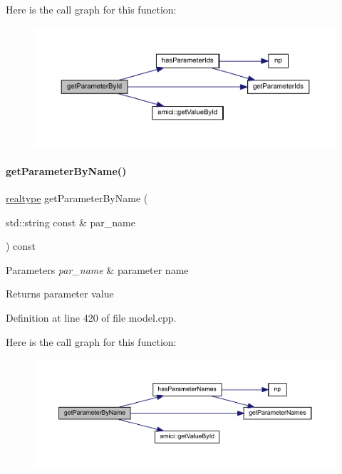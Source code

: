 Here is the call graph for this function\+:
\nopagebreak
\begin{figure}[H]
\begin{center}
\leavevmode
\includegraphics[width=350pt]{classamici_1_1_model_a4436bd89ae2cb032cbf13db478d99e15_cgraph}
\end{center}
\end{figure}
\mbox{\label{classamici_1_1_model_a19b349ca9793d45fda7ef8ea7422747a}} 
\paragraph{\texorpdfstring{getParameterByName()}{getParameterByName()}}
{\footnotesize\ttfamily \mbox{\hyperlink{namespaceamici_a1bdce28051d6a53868f7ccbf5f2c14a3}{realtype}} get\+Parameter\+By\+Name (\begin{DoxyParamCaption}\item[{std\+::string const \&}]{par\+\_\+name }\end{DoxyParamCaption}) const}


\begin{DoxyParams}{Parameters}
{\em par\+\_\+name} & parameter name \\
\hline
\end{DoxyParams}
\begin{DoxyReturn}{Returns}
parameter value 
\end{DoxyReturn}


Definition at line 420 of file model.\+cpp.

Here is the call graph for this function\+:
\nopagebreak
\begin{figure}[H]
\begin{center}
\leavevmode
\includegraphics[width=350pt]{classamici_1_1_model_a19b349ca9793d45fda7ef8ea7422747a_cgraph}
\end{center}
\end{figure}
\mbox{\label{classamici_1_1_model_a995357a19663980279249d4b89a88f7a}} 
